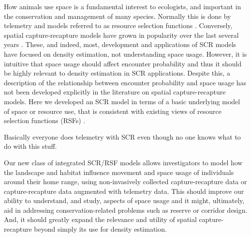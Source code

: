 How animals use space is a fundamental interest to ecologists, and
important in the conservation and management of many species.
Normally this is done by telemetry and models referred to as resource
selection functions \citep{manly_etal:2002}.  Conversely, spatial
capture-recapture models have grown in popularity over the last
several years \citep{efford:2004,borchers_efford:2008, royle:2008,
  efford_etal:2009ecol,royle_etal:2009ecol, gardner_etal:2010ecol,
  gardner_etal:2010jwm, kery_etal:2010,
  sollmann_etal:2011,mollet_etal:2012,gopalaswamy_etal:2012}. These,
and indeed, most, development and applications of SCR models have
focused on density estimation, not understanding space usage.
However, it is intuitive that space usage should affect encounter
probability and thus it should be highly relevant to density
estimation in SCR applications. Despite this, a description of the
relationship between encounter probability and space usage has not
been developed explicitly in the literature on spatial
capture-recapture models.  Here we developed an SCR model in terms of
a basic underlying model of space or resource use, that is consistent
with existing views of resource selection functions (RSFs)
\citep{manly_etal:2002}.

Basically everyone does telemetry with SCR even though no one knows
what to do with this stuff.

Our new class of integrated SCR/RSF models allows investigators to model how the landscape and
habitat influence movement and space usage of individuals around their
home range, using non-invasively collected capture-recapture data or
capture-recapture data augmented with telemetry data.  This should
improve our ability to understand, and study, aspects of space usage
and it might, ultimately, aid in addressing conservation-related
problems such as reserve or corridor design. And, it should greatly
expand the relevance and utility of spatial capture-recapture beyond
simply its use for density estimation.


